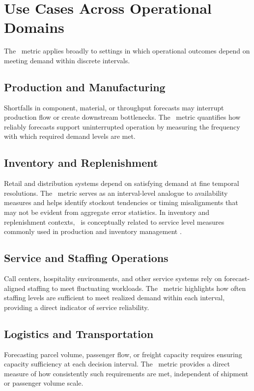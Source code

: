 \section{Use Cases Across Operational Domains}

The \NSL\ metric applies broadly to settings in which operational outcomes depend
on meeting demand within discrete intervals.

\subsection{Production and Manufacturing}

Shortfalls in component, material, or throughput forecasts may interrupt
production flow or create downstream bottlenecks. The \NSL\ metric quantifies how
reliably forecasts support uninterrupted operation by measuring the frequency
with which required demand levels are met.

\subsection{Inventory and Replenishment}

Retail and distribution systems depend on satisfying demand at fine temporal
resolutions. The \NSL\ metric serves as an interval-level analogue to availability
measures and helps identify stockout tendencies or timing misalignments that may
not be evident from aggregate error statistics. In inventory and replenishment
contexts, \NSL\ is conceptually related to service level measures commonly used in
production and inventory management \citep{silver1998inventory}.

\subsection{Service and Staffing Operations}

Call centers, hospitality environments, and other service systems rely on
forecast-aligned staffing to meet fluctuating workloads. The \NSL\ metric
highlights how often staffing levels are sufficient to meet realized demand within
each interval, providing a direct indicator of service reliability.

\subsection{Logistics and Transportation}

Forecasting parcel volume, passenger flow, or freight capacity requires ensuring
capacity sufficiency at each decision interval. The \NSL\ metric provides a direct
measure of how consistently such requirements are met, independent of shipment or
passenger volume scale.
